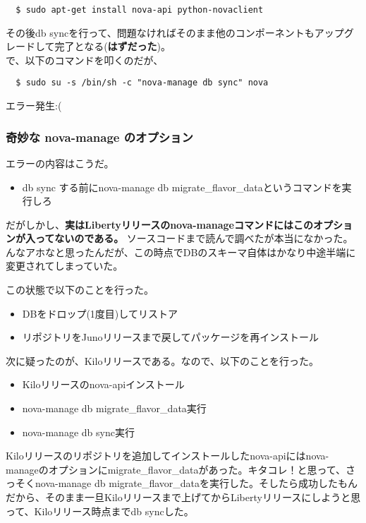 \documentclass[9pt,b5paper,tombo,openany]{jsbook}
\begin{document}
\begin{lstlisting}
  $ sudo apt-get install nova-api python-novaclient
\end{lstlisting}

その後db syncを行って、問題なければそのまま他のコンポーネントもアップグレードして完了となる(\textbf{はずだった})。\\[1ex]

\noindent
で、以下のコマンドを叩くのだが、

\begin{lstlisting}
  $ sudo su -s /bin/sh -c "nova-manage db sync" nova
\end{lstlisting}

\noindent
エラー発生:(

\subsubsection{奇妙な nova-manage のオプション}
\noindent
エラーの内容はこうだ。

\begin{itemize}
  \item db sync する前にnova-manage db migrate\_flavor\_dataというコマンドを実行しろ
\end{itemize}

だがしかし、\textbf{実はLibertyリリースのnova-manageコマンドにはこのオプションが入ってないのである。} ソースコードまで読んで調べたが本当になかった。んなアホなと思ったんだが、この時点でDBのスキーマ自体はかなり中途半端に変更されてしまっていた。

\noindent
この状態で以下のことを行った。

\begin{itemize}
  \item DBをドロップ(1度目)してリストア
  \item リポジトリをJunoリリースまで戻してパッケージを再インストール
\end{itemize}

\noindent
次に疑ったのが、Kiloリリースである。なので、以下のことを行った。

\begin{itemize}
  \item Kiloリリースのnova-apiインストール
  \item nova-manage db migrate\_flavor\_data実行
  \item nova-manage db sync実行
\end{itemize}

Kiloリリースのリポジトリを追加してインストールしたnova-apiにはnova-manageのオプションにmigrate\_flavor\_dataがあった。キタコレ！と思って、さっそくnova-manage db migrate\_flavor\_dataを実行した。そしたら成功したもんだから、そのまま一旦Kiloリリースまで上げてからLibertyリリースにしようと思って、Kiloリリース時点までdb syncした。\\[1ex]
\end{document}
